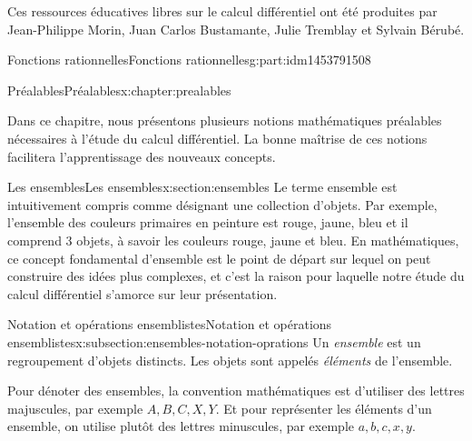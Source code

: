 \documentclass[oneside,10pt,]{book}
\begin{document}
Ces ressources éducatives libres sur le calcul différentiel ont été produites par Jean-Philippe Morin, Juan Carlos Bustamante, Julie Tremblay et Sylvain Bérubé.%
%
%
\typeout{************************************************}
\typeout{************************************************}
%
\begin{partptx}{Fonctions rationnelles}{}{Fonctions rationnelles}{}{}{g:part:idm1453791508}
%
\typeout{************************************************}
\typeout{************************************************}
%
\begin{chapterptx}{Préalables}{}{Préalables}{}{}{x:chapter:prealables}
\begin{introduction}{}%
Dans ce chapitre, nous présentons plusieurs notions mathématiques préalables nécessaires à l’étude du calcul différentiel. La bonne maîtrise de ces notions facilitera l'apprentissage des nouveaux concepts.%
\end{introduction}%
%
%
\typeout{************************************************}
\typeout{************************************************}
%
\begin{sectionptx}{Les ensembles}{}{Les ensembles}{}{}{x:section:ensembles}
Le terme ensemble est intuitivement compris comme désignant une collection d'objets. Par exemple, l'ensemble des couleurs primaires en peinture est \textbraceleft{}rouge, jaune, bleu\textbraceright{} et il comprend 3 objets, à savoir les couleurs rouge, jaune et bleu. En mathématiques, ce concept fondamental d'ensemble est le point de départ sur lequel on peut construire des idées plus complexes, et c'est la raison pour laquelle notre étude du calcul différentiel s'amorce sur leur présentation.%
%
%
\typeout{************************************************}
\typeout{************************************************}
%
\begin{subsectionptx}{Notation et opérations ensemblistes}{}{Notation et opérations ensemblistes}{}{}{x:subsection:ensembles-notation-oprations}
Un \emph{ensemble} est un regroupement d'objets distincts. Les objets sont appelés \emph{éléments} de l'ensemble.%
\par
Pour dénoter des ensembles, la convention mathématiques est d'utiliser des lettres majuscules, par exemple \(A, B, C, X, Y\). Et pour représenter les éléments d'un ensemble, on utilise plutôt des lettres minuscules, par exemple \(a, b, c, x, y\).%

\end{subsectionptx}
\end{sectionptx}
\end{chapterptx}
\end{partptx}
\end{document}
